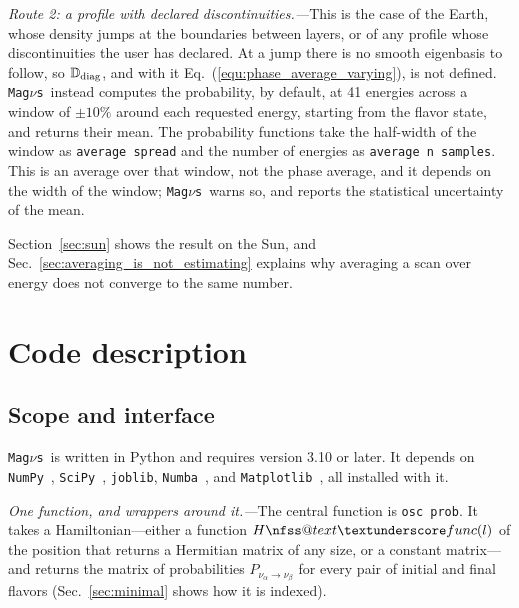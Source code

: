 \documentclass[final,5p,times,twocolumn,sort,compress]{elsarticle}
\makeatletter
\newcommand{\eq}{Eq.}
\DeclareRobustCommand{\_}{%
  \ifmmode\nfss@text{\textunderscore}\else\textunderscore\allowbreak\fi}
\newcommand{\equ}[1]{\eq~(\ref{equ:#1})}
\newcommand{\magnus}{{\tt Mag}\ensuremath{\nu}{\tt s}}
\makeatother
\begin{document}
\smallskip

\textit{Route 2: a profile with declared discontinuities.---}This is the case of the Earth, whose density jumps at the boundaries between layers, or of any profile whose discontinuities the user has declared. At a jump there is no smooth eigenbasis to follow, so $\mathbb{D}_{\rm diag}$, and with it \equ{phase_average_varying}, is not defined. \magnus\ instead computes the probability, by default, at 41 energies  across a window of $\pm 10\%$ around each requested energy, starting from the flavor state, and returns their mean. The probability functions take the half-width of the window as {\tt average\_spread} and the number of energies as {\tt average\_n\_samples}. This is an average over that window, not the phase average, and it depends on the width of the window; \magnus\ warns so, and reports the statistical uncertainty of the mean.

\smallskip

Section~\ref{sec:sun} shows the result on the Sun, and Sec.~\ref{sec:averaging_is_not_estimating} explains why averaging a scan over energy does not converge to the same number.


\section{Code description}
\label{sec:code}


\subsection{Scope and interface}
\label{sec:scope_interface}

\magnus\ is written in Python and requires version 3.10 or later. It depends on {\tt NumPy}\ \cite{Harris:2020xlr}, {\tt SciPy}\ \cite{Virtanen:2019joe}, {\tt joblib}, {\tt Numba}\ \cite{Lam:2015numba}, and {\tt Matplotlib}\ \cite{Hunter:2007ouj}, all installed with it.

\smallskip

\textit{One function, and wrappers around it.---}The central function is {\tt osc\_prob}. It takes a Hamiltonian---either a function ${\tt H\_func}(l)$ of the position that returns a Hermitian matrix of any size, or a constant matrix---and returns the matrix of probabilities $P_{\nu_\alpha \to \nu_\beta}$ for every pair of initial and final flavors (Sec.~\ref{sec:minimal} shows how it is indexed). 
\end{document}
